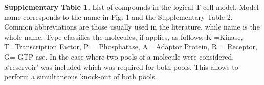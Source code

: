 \documentclass[a4paper, 12pt,epsfig, onecolumn]{article}
\begin{document}
{\sf


\noindent
\textbf{Supplementary Table 1.}  List of compounds in the logical T-cell model. Model name
corresponds to the name in Fig. 1 and the Supplementary Table 2. Common
abbreviations are those usually used in the literature, while name is the
whole name. Type classifies the molecules, if applies, as follows: K =Kinase,
T=Transcription Factor, P = Phosphatase, A =Adaptor Protein, R = Receptor, G=
GTP-ase. In the   case where two pools of a molecule were considered, a'reservoir'  was included which was required for both pools. This allows to perform a simultaneous knock-out of both pools. 

\begin{longtable}{|p{}|p{}|p{}|p{}|p{}|}


\end{longtable}}
\end{document}
